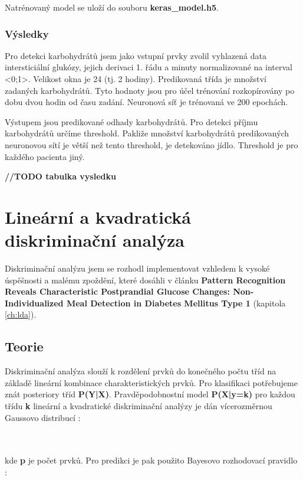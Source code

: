 Natrénovaný model se uloží do souboru \textbf{keras\_model.h5}.

\subsubsection{Výsledky}

Pro detekci karbohydrátů jsem jako vstupní prvky zvolil vyhlazená data intersticiální glukózy, jejich derivaci 1. řádu a minuty normalizované na interval <0;1>. Velikost okna je 24 (tj. 2 hodiny). Predikovaná třída je množství zadaných karbohydrátů. Tyto hodnoty jsou pro účel trénování rozkopírovány po dobu dvou hodin od času zadání. Neuronová síť je trénovaná ve 200 epochách.

Výstupem jsou predikované odhady karbohydrátů. Pro detekci příjmu karbohydrátů určíme threshold. Pakliže množství karbohydrátů predikovaných neuronovou sítí je větší než tento threshold, je detekováno jídlo. Threshold je pro každého pacienta jiný.

\textbf{//TODO tabulka vysledku}

\section{Lineární a kvadratická diskriminační analýza}
\label{ch:lda_qda}

Diskriminační analýzu jsem se rozhodl implementovat vzhledem k vysoké úspěšnosti a malému zpoždění, které dosáhli \citet{Analyza.LDA} v článku \textbf{Pattern Recognition Reveals Characteristic Postprandial Glucose Changes: Non-Individualized Meal Detection in Diabetes Mellitus Type 1} (kapitola \ref{ch:lda}).

\subsection{Teorie}
Diskriminační analýza slouží k rozdělení prvků do konečného počtu tříd na základě lineární kombinace charakteristických prvků. Pro klasifikaci potřebujeme znát posteriory tříd \textbf{P(Y|X)}. Pravděpodobnostní model \textbf{P(X|y=k)} pro každou třídu \textbf{k} lineární a kvadratické diskriminační analýzy je dán vícerozměrnou Gaussovo distribucí \citep{cho.book.lda}:

\\\\
kde \textbf{p} je počet prvků. Pro predikci je pak použito Bayesovo rozhodovací pravidlo \citep{cho.book.lda}:

